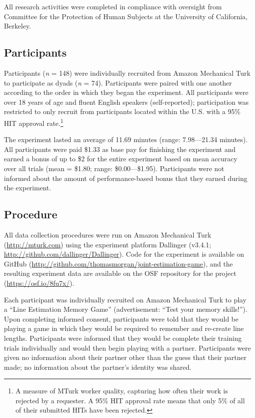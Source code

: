 \documentclass[10pt, letterpaper]{article}
\begin{document}
All research activities were completed in compliance with oversight from
Committee for the Protection of Human Subjects at the University of
California, Berkeley.

\subsection{Participants}\label{participants}

Participants (\emph{n} = 148) were individually recruited from Amazon
Mechanical Turk to participate as dyads (\emph{n} = 74). Participants
were paired with one another according to the order in which they began
the experiment. All participants were over 18 years of age and fluent
English speakers (self-reported); participation was restricted to only
recruit from participants located within the U.S. with a 95\% HIT
approval
rate.\footnote{A measure of MTurk worker quality, capturing how often their work is rejected by a requester. A 95\% HIT approval rate means that only 5\% of all of their submitted HITs have been rejected.}

The experiment lasted an average of 11.69 minutes (range: 7.98---21.34
minutes). All participants were paid \$1.33 as base pay for finishing
the experiment and earned a bonus of up to \$2 for the entire experiment
based on mean accuracy over all trials (mean = \$1.80; range:
\$0.00---\$1.95). Participants were not informed about the amount of
performance-based bonus that they earned during the experiment.

\subsection{Procedure}\label{procedure}

All data collection procedures were run on Amazon Mechanical Turk
(\url{http://mturk.com}) using the experiment platform Dallinger
(v3.4.1; \url{http://github.com/dallinger/Dallinger}). Code for the
experiment is available on GitHub
(\url{http://github.com/thomasmorgan/joint-estimation-game}), and the
resulting experiment data are available on the OSF repository for the
project (\url{https://osf.io/8fu7x/}).

Each participant was individually recruited on Amazon Mechanical Turk to
play a ``Line Estimation Memory Game'' (advertisement: ``Test your
memory skills!''). Upon completing informed consent, participants were
told that they would be playing a game in which they would be required
to remember and re-create line lengths. Participants were informed that
they would be complete their training trials individually and would then
begin playing with a partner. Participants were given no information
about their partner other than the guess that their partner made; no
information about the partner's identity was shared.
\end{document}
